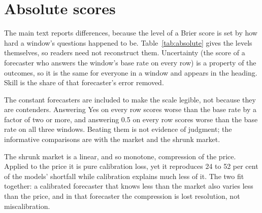 \section{Absolute scores}
\label{app:absolute}
The main text reports differences, because the level of a Brier score is set by
how hard a window's questions happened to be. Table~\ref{tab:absolute} gives
the levels themselves, so readers need not reconstruct them. Uncertainty (the
score of a forecaster who answers the window's base rate on every row) is a
property of the outcomes, so it is the same for everyone in a window and appears
in the heading. Skill is the share of that forecaster's error removed.

The constant forecasters are included to make the scale legible, not because
they are contenders. Answering Yes on every row scores worse than the
base rate by a factor of two or more, and answering 0.5 on every row scores
worse than the base rate on all three windows. Beating them is not evidence of
judgment; the informative comparisons are with the market and the shrunk market.

The shrunk market is a linear, and so monotone, compression of the price. Applied
to the price it is pure calibration loss, yet it reproduces 24 to 52 per cent of
the models' shortfall while calibration explains much less of it. The two fit
together: a calibrated forecaster that knows less than the market also varies
less than the price, and in that forecaster the compression is lost resolution,
not miscalibration.

\begin{table}[!tbp]
\centering
\caption{Absolute scores on the test split of the primary set. Brier and
reliability are lower-is-better; resolution and skill are higher-is-better. Constant
forecasters have no resolution by construction and their reliability is not comparable
with a varying forecaster's, so those cells are left blank. Reliability minus resolution plus
uncertainty differs from Brier by up to 0.002, the within-bin term that ten bins leave
out~\citep{stephenson2008}. The market rows average the market's score over every model's
rows stacked together, so they differ in the fourth decimal from the market score behind any
one model's Brier edge, which is computed row by row on that model's own rows. The Brier edge (market minus model, on each model's own rows) and the
market-minus-model resolution carry 95\% event-resampling ranges.}
\label{tab:absolute}

\end{table}

